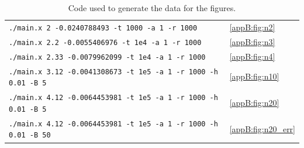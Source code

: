 \begin{table}[h]
    \centering
    \begin{tabular}{|l|l|}
        \hline
        \texttt{./main.x 2 -0.0240788493 -t 1000 -a 1 -r 1000} & \ref{appB:fig:n2} \\
        \texttt{./main.x 2.2 -0.0055406976 -t 1e4 -a 1 -r 1000} & \ref{appB:fig:n3} \\
        \texttt{./main.x 2.33 -0.0079962099 -t 1e4 -a 1 -r 1000} & \ref{appB:fig:n4} \\
        \texttt{./main.x 3.12 -0.0041308673 -t 1e5 -a 1 -r 1000 -h 0.01 -B 5} & \ref{appB:fig:n10} \\
        \texttt{./main.x 4.12 -0.0064453981 -t 1e5 -a 1 -r 1000 -h 0.01 -B 5} & \ref{appB:fig:n20} \\
        \texttt{./main.x 4.12 -0.0064453981 -t 1e5 -a 1 -r 1000 -h 0.01 -B 50} & \ref{appB:fig:n20_err} \\
        \hline
    \end{tabular}
    \caption{Code used to generate the data for the figures.}
    \label{app:tab:code}
\end{table}

